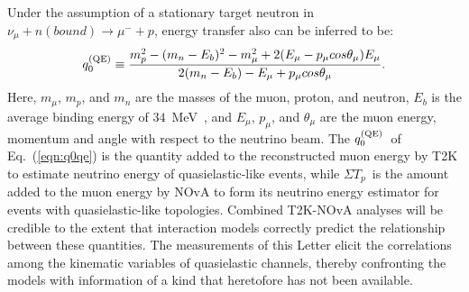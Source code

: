 \documentclass[aps,prl,twocolumn,showpacs,superscriptaddress, floatfix]{revtex4-2}  %
\newcommand{\sumtp}{\ensuremath{\Sigma T_{p}}}
\newcommand{\qzeroqe}{\ensuremath{q_{0}^{\rm\scriptstyle (QE)}}}
\begin{document}
Under the assumption of a stationary target neutron in $\nu_\mu + n (bound) \rightarrow \mu^- + p$, energy transfer also can be inferred to be:
\begin{equation}
    \qzeroqe \equiv\frac{m_p^2-(m_n-E_b)^2-m_\mu^2+2(E_\mu-p_\mu cos\theta_\mu)E_\mu}{2(m_n-E_b)-E_\mu+p_\mu cos\theta_\mu}. \label{eqn:q0qe}
\end{equation}
Here, $m_\mu$, $m_p$, and $m_n$ are the masses of the muon, proton, and neutron, $E_b$ is the average binding energy of $34$~MeV~\cite{Bodek:2018lmc,Katori:2008zz,Moniz:1971mt}, and $E_\mu$, $p_\mu$, and $\theta_\mu$ are the muon energy, momentum and angle with respect to the neutrino beam.
The \qzeroqe\ of Eq.~(\ref{eqn:q0qe}) is the quantity added to the reconstructed muon energy by T2K to estimate neutrino energy of quasielastic-like events, while \sumtp\ is the amount added to the muon energy by NOvA to form its neutrino energy estimator for events with quasielastic-like topologies.  Combined T2K-NOvA analyses 
will be credible to the extent that interaction models correctly predict the relationship between these quantities.
The measurements of this Letter elicit the correlations among the kinematic variables of quasielastic channels, thereby confronting the models with information of a kind that heretofore has not been available.
\end{document}
